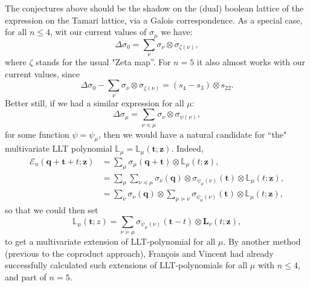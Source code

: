 \documentclass[12pt]{amsart}
\theoremstyle{plain}
\theoremstyle{definition}
\theoremstyle{remark}
\begin{document}
The conjectures above should be the shadow on the (dual) boolean lattice of the expression on the Tamari lattice, via a Galois correspondence.
As a special case, for all $n\leq 4$, wit our current values of $\sigma_\mu$ we have:
     $${\Delta \sigma_0 = \sum_{\nu}  \sigma_\nu \otimes \sigma_{\zeta(\nu)}},$$
where $\zeta$ stands for the usual "Zeta map”. For $n=5$ it also almost works with our current values, since
$$\Delta \sigma_0 - \sum_{\nu}  \sigma_\nu \otimes \sigma_{\zeta(\nu)} = (s_4-s_3)\otimes s_{22}.$$
Better still, if we had a similar expression for all $\mu$:
\begin{equation}\label{eq:coproduct_all}
   \Delta \sigma_\mu = \sum_{\nu\preceq \mu}  \sigma_\nu \otimes \sigma_{\psi(\nu)},
 \end{equation}
for some function $\psi=\psi_\mu$, then we would have a natural candidate for “the" multivariate LLT polynomial $\mathbb{L}_\mu=\mathbb{L}_\mu(\bm {t};\bm {z})$. Indeed, 
\begin{align*}
     \mathcal{E}_n(\bm {q}+\bm {t}+t;\bm {z}) &= \sum_\mu \sigma_\mu(\bm {q}+\bm{t}) \otimes \mathbb{L}_\mu(t;\bm{z}),\\
              &= \sum_\mu \sum_{\nu\preceq \mu}  \sigma_\nu(\bm {q}) \otimes \sigma_{\psi_\mu(\nu)}(\bm {t}) \otimes \mathbb{L}_\mu(t;\bm{z}),\\
              &= \sum_\nu \sigma_\nu(\bm {q}) \otimes \sum_{\mu\succeq \nu}  \sigma_{\psi_\mu(\nu)}(\bm {t}) \otimes \mathbb{L}_\mu(t;\bm{z}),
  \end{align*}
so that we could then set
   $$ \mathbb{L}_\mu(\bm {t};z) = \sum_{\nu\succeq \mu} \sigma_{\psi_\mu(\nu)}(\bm {t}-t)\otimes \bm {L}_\nu(t;\bm {z}),$$
  to get a multivariate extension of LLT-polynomial for all $\mu$. By another method (previous to the coproduct approach), François and Vincent had already successfully calculated such extensions of LLT-polynomials for all $\mu$ with $n\leq 4$, and part of $n=5$. 
\end{document}
